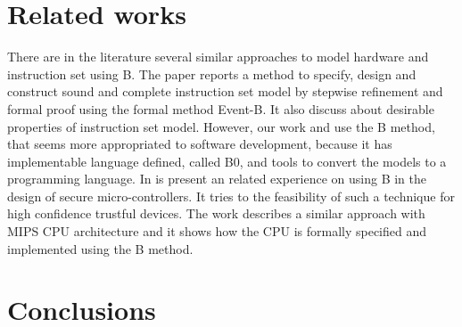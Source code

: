 \documentclass[a4paper]{llncs}
\begin{document}
 

\section{Related works}
\label{sec:relatedworks}

There are in the literature several similar approaches to model hardware and instruction set using B.
The paper \cite{springerlink:Yuan2011} reports a method to specify, design and construct sound and complete instruction set model by stepwise refinement and formal proof using the formal method Event-B. It also discuss about desirable properties of instruction set model. However, our work \cite{Valerio_SBMF09} and \cite{Subotic2010} use the B method, that seems more appropriated to software development, because it has implementable language defined, 
called B0, and tools to convert the models to a programming language.
In \cite{Marc20113} is present an related experience on using B in the design of secure micro-controllers. It tries to the feasibility of such a technique for high confidence trustful devices. The work \cite{Subotic2010} describes a similar approach with MIPS CPU architecture and it shows how the CPU is formally specified and implemented using the B method.


% 
%
%
%

 
\section{Conclusions}
\label{sec:conclusions} 
\end{document}
